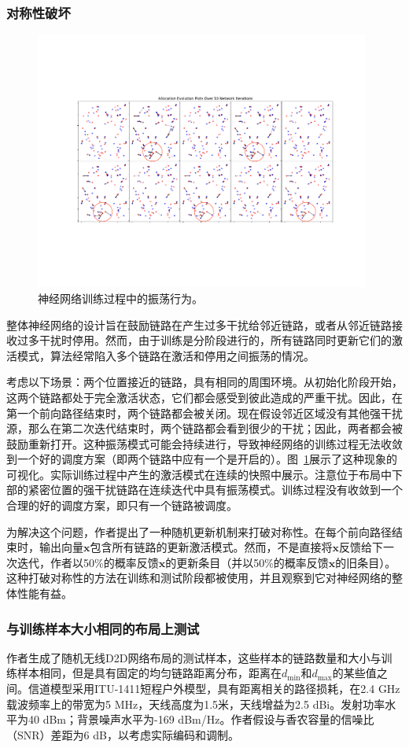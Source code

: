 \documentclass[UTF8, 12pt]{article}
\numberwithin{figure}{section}
\begin{document}
\subsubsection{对称性破坏}
\begin{figure}[hbp]
\centering
\includegraphics[width=11cm]{fig/ConvNet_LocalSymmetry2}
\caption{神经网络训练过程中的振荡行为。}
\label{fig: evoSymmetry}
\end{figure}

整体神经网络的设计旨在鼓励链路在产生过多干扰给邻近链路，或者从邻近链路接收过多干扰时停用。然而，由于训练是分阶段进行的，所有链路同时更新它们的激活模式，算法经常陷入多个链路在激活和停用之间振荡的情况。

考虑以下场景：两个位置接近的链路，具有相同的周围环境。从初始化阶段开始，这两个链路都处于完全激活状态，它们都会感受到彼此造成的严重干扰。因此，在第一个前向路径结束时，两个链路都会被关闭。现在假设邻近区域没有其他强干扰源，那么在第二次迭代结束时，两个链路都会看到很少的干扰；因此，两者都会被鼓励重新打开。这种振荡模式可能会持续进行，导致神经网络的训练过程无法收敛到一个好的调度方案（即两个链路中应有一个是开启的）。图~\ref{fig: evoSymmetry}展示了这种现象的可视化。实际训练过程中产生的激活模式在连续的快照中展示。注意位于布局中下部的紧密位置的强干扰链路在连续迭代中具有振荡模式。训练过程没有收敛到一个合理的好的调度方案，即只有一个链路被调度。

为解决这个问题，作者提出了一种随机更新机制来打破对称性。在每个前向路径结束时，输出向量$\mathbf x$包含所有链路的更新激活模式。然而，不是直接将$\mathbf x$反馈给下一次迭代，作者以50\%的概率反馈$\mathbf x$的更新条目（并以50\%的概率反馈$\mathbf x$的旧条目）。这种打破对称性的方法在训练和测试阶段都被使用，并且观察到它对神经网络的整体性能有益。

\subsubsection{与训练样本大小相同的布局上测试}
作者生成了随机无线D2D网络布局的测试样本，这些样本的链路数量和大小与训练样本相同，但是具有固定的均匀链路距离分布，距离在$d_{\min}$和$d_{\max}$的某些值之间。信道模型采用ITU-1411短程户外模型，具有距离相关的路径损耗\cite{itu1411}，在2.4 GHz载波频率上的带宽为5 MHz，天线高度为1.5米，天线增益为2.5 dBi。发射功率水平为40 dBm；背景噪声水平为-169 dBm/Hz。作者假设与香农容量的信噪比（SNR）差距为6 dB，以考虑实际编码和调制。
\end{document}
